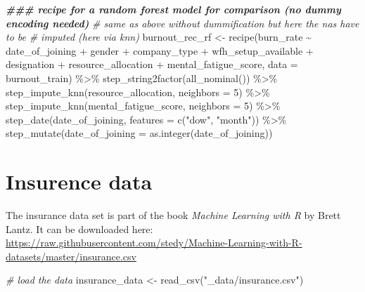 \documentclass[
]{book}
\newenvironment{Shaded}{\begin{snugshade}}{\end{snugshade}}
\newcommand{\AttributeTok}[1]{\textcolor[rgb]{0.77,0.63,0.00}{#1}}
\newcommand{\CommentTok}[1]{\textcolor[rgb]{0.56,0.35,0.01}{\textit{#1}}}
\newcommand{\DecValTok}[1]{\textcolor[rgb]{0.00,0.00,0.81}{#1}}
\newcommand{\DocumentationTok}[1]{\textcolor[rgb]{0.56,0.35,0.01}{\textbf{\textit{#1}}}}
\newcommand{\FunctionTok}[1]{\textcolor[rgb]{0.00,0.00,0.00}{#1}}
\newcommand{\NormalTok}[1]{#1}
\newcommand{\OtherTok}[1]{\textcolor[rgb]{0.56,0.35,0.01}{#1}}
\newcommand{\SpecialCharTok}[1]{\textcolor[rgb]{0.00,0.00,0.00}{#1}}
\newcommand{\StringTok}[1]{\textcolor[rgb]{0.31,0.60,0.02}{#1}}
\begin{document}
\begin{Shaded}
\begin{Highlighting}[]
\DocumentationTok{\#\#\# recipe for a random forest model for comparison (no dummy encoding needed)}
\CommentTok{\# same as above without dummification but here the na\textquotesingle{}s have to be}
\CommentTok{\# imputed (here via knn)}
\NormalTok{burnout\_rec\_rf }\OtherTok{\textless{}{-}} \FunctionTok{recipe}\NormalTok{(burn\_rate }\SpecialCharTok{\textasciitilde{}}\NormalTok{ date\_of\_joining }\SpecialCharTok{+}\NormalTok{ gender }\SpecialCharTok{+}
\NormalTok{                         company\_type }\SpecialCharTok{+}\NormalTok{ wfh\_setup\_available }\SpecialCharTok{+}
\NormalTok{                         designation }\SpecialCharTok{+}\NormalTok{ resource\_allocation }\SpecialCharTok{+}
\NormalTok{                         mental\_fatigue\_score,}
                         \AttributeTok{data =}\NormalTok{ burnout\_train) }\SpecialCharTok{\%\textgreater{}\%}
  \FunctionTok{step\_string2factor}\NormalTok{(}\FunctionTok{all\_nominal}\NormalTok{()) }\SpecialCharTok{\%\textgreater{}\%}
  \FunctionTok{step\_impute\_knn}\NormalTok{(resource\_allocation, }\AttributeTok{neighbors =} \DecValTok{5}\NormalTok{) }\SpecialCharTok{\%\textgreater{}\%}
  \FunctionTok{step\_impute\_knn}\NormalTok{(mental\_fatigue\_score, }\AttributeTok{neighbors =} \DecValTok{5}\NormalTok{) }\SpecialCharTok{\%\textgreater{}\%}
  \FunctionTok{step\_date}\NormalTok{(date\_of\_joining, }\AttributeTok{features =} \FunctionTok{c}\NormalTok{(}\StringTok{"dow"}\NormalTok{, }\StringTok{"month"}\NormalTok{)) }\SpecialCharTok{\%\textgreater{}\%}
  \FunctionTok{step\_mutate}\NormalTok{(}\AttributeTok{date\_of\_joining =} \FunctionTok{as.integer}\NormalTok{(date\_of\_joining))}
\end{Highlighting}
\end{Shaded}

\hypertarget{insurence-data}{%
\section{Insurence data}\label{insurence-data}}

The insurance data set is part of the book \emph{Machine Learning with R} by Brett Lantz. It can be downloaded here:
\url{https://raw.githubusercontent.com/stedy/Machine-Learning-with-R-datasets/master/insurance.csv}

\begin{Shaded}
\begin{Highlighting}[]
\CommentTok{\# load the data}
\NormalTok{insurance\_data }\OtherTok{\textless{}{-}} \FunctionTok{read\_csv}\NormalTok{(}\StringTok{"\_data/insurance.csv"}\NormalTok{)}
\end{Highlighting}
\end{Shaded}
\end{document}
